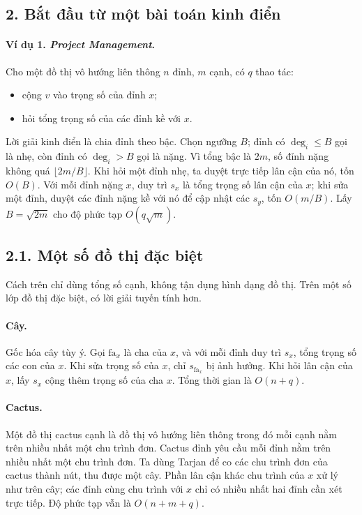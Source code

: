 \documentclass[11pt]{article}
\begin{document}
\subsection*{2. Bắt đầu từ một bài toán kinh điển}

\paragraph{Ví dụ 1. \emph{Project Management}.}
Cho một đồ thị vô hướng liên thông \(n\) đỉnh, \(m\) cạnh, có \(q\) thao tác:
\begin{itemize}
  \item cộng \(v\) vào trọng số của đỉnh \(x\);
  \item hỏi tổng trọng số của các đỉnh kề với \(x\).
\end{itemize}

Lời giải kinh điển là chia đỉnh theo bậc. Chọn ngưỡng \(B\); đỉnh có
\(\deg_i\le B\) gọi là nhẹ, còn đỉnh có \(\deg_i>B\) gọi là nặng. Vì tổng bậc
là \(2m\), số đỉnh nặng không quá \(\lfloor 2m/B\rfloor\). Khi hỏi một đỉnh
nhẹ, ta duyệt trực tiếp lân cận của nó, tốn \(O(B)\). Với mỗi đỉnh nặng \(x\),
duy trì \(s_x\) là tổng trọng số lân cận của \(x\); khi sửa một đỉnh, duyệt các
đỉnh nặng kề với nó để cập nhật các \(s_y\), tốn \(O(m/B)\). Lấy
\(B=\sqrt{2m}\) cho độ phức tạp \(O(q\sqrt m)\).

\subsection*{2.1. Một số đồ thị đặc biệt}

Cách trên chỉ dùng tổng số cạnh, không tận dụng hình dạng đồ thị. Trên một số
lớp đồ thị đặc biệt, có lời giải tuyến tính hơn.

\paragraph{Cây.}
Gốc hóa cây tùy ý. Gọi \(\mathrm{fa}_x\) là cha của \(x\), và với mỗi đỉnh
duy trì \(s_x\), tổng trọng số các con của \(x\). Khi sửa trọng số của \(x\),
chỉ \(s_{\mathrm{fa}_x}\) bị ảnh hưởng. Khi hỏi lân cận của \(x\), lấy
\(s_x\) cộng thêm trọng số của cha \(x\). Tổng thời gian là \(O(n+q)\).

\paragraph{Cactus.}
Một đồ thị cactus cạnh là đồ thị vô hướng liên thông trong đó mỗi cạnh nằm
trên nhiều nhất một chu trình đơn. Cactus đỉnh yêu cầu mỗi đỉnh nằm trên nhiều
nhất một chu trình đơn. Ta dùng Tarjan để co các chu trình đơn của cactus thành
nút, thu được một cây. Phần lân cận khác chu trình của \(x\) xử lý như trên
cây; các đỉnh cùng chu trình với \(x\) chỉ có nhiều nhất hai đỉnh cần xét trực
tiếp. Độ phức tạp vẫn là \(O(n+m+q)\).
\end{document}
